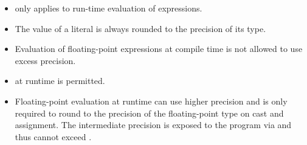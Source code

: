 \begin{itemize}
  \item {} only applies to run-time evaluation of \fp expressions.

  \item The value of a \fp literal is always rounded to the precision of its
    type.

  \item Evaluation of floating-point expressions at compile time is not allowed
    to use excess precision.

  \item {} at runtime is permitted.

  \item Floating-point evaluation at runtime can use higher precision and is
    only required to round to the precision of the floating-point type on cast
    and assignment. The intermediate precision is exposed to the program via
     and thus cannot exceed .
\end{itemize}

